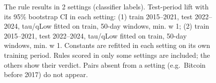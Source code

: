 \begin{figure}[t]
{\begin{tabular}{lllllll}
\bottomrule
\end{tabular}
}
\caption{The rule results in 2 settings (classifier labels). Test-period lift with its 95\% bootstrap CI in each setting: (1) train 2015–2021, test 2022–2024, tau/qLow fitted on train, 50-day windows, min. w 1; (2) train 2015–2021, test 2022–2024, tau/qLow fitted on train, 50-day windows, min. w 1. Constants are refitted in each setting on its own training period. Rules scored in only some settings are included; the others show their verdict. Pairs absent from a setting (e.g.\ Bitcoin before 2017) do not appear.}
\label{fig:robustness_classifier}
\end{figure}

